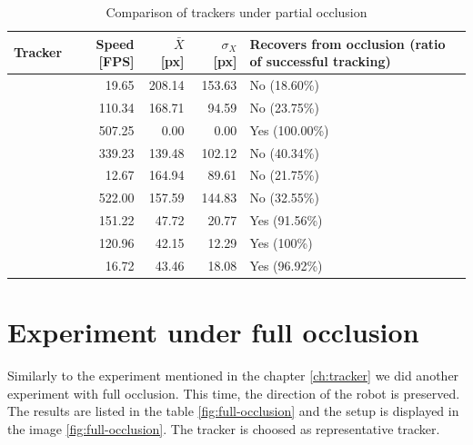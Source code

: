 \begin{table}
\centering
\begin{tabular}{l|r|r|r|p{4cm}}
Tracker & Speed [FPS] & $\bar{X}$ [px] & $\sigma_X$ [px] &  Recovers from occlusion (ratio of successful tracking) \\
\hline
\boost{} & 19.65 & 208.14 & 153.63 & No (18.60\%) \\
\corr{} & 110.34 & 168.71 & 94.59 & No (23.75\%)\\
\hsv{} & 507.25 & 0.00 & 0.00 & Yes (100.00\%) \\
\medflow{} & 339.23 & 139.48 & 102.12 & No (40.34\%) \\
\mil{} & 12.67 & 164.94 & 89.61 &  No (21.75\%)\\
\mosse{} & 522.00 & 157.59 & 144.83 & No (32.55\%) \\
\patt{} & 151.22 & 47.72 & 20.77 & Yes (91.56\%)\\
\simback{} & 120.96 & 42.15 & 12.29 & Yes (100\%)\\
\tld{} & 16.72 & 43.46 & 18.08 & Yes (96.92\%)\\
\end{tabular}
\caption{Comparison of trackers under partial occlusion}
\label{table:partial-occlusion}
\end{table}


\section{Experiment under full occlusion}

Similarly to the experiment mentioned in the chapter \ref{ch:tracker} we did
another experiment with full occlusion. This time, the direction of the robot
is preserved. The results are listed in the table \ref{fig:full-occlusion} and
the setup is displayed in the image \ref{fig:full-occlusion}. The \hsv{}
tracker is choosed as representative tracker.

